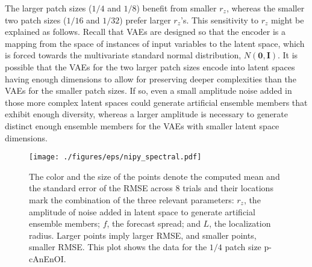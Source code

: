 \documentclass[final,3p]{elsarticle}
\theoremstyle{break}
\newcommand{\bb}[1]{\mathbf{#1}}
\begin{document}
The larger patch sizes ($1/4$ and $1/8$) benefit from smaller $r_z$, whereas the smaller two patch sizes ($1/16$ and $1/32$) prefer larger $r_z$'s.
This sensitivity to $r_z$ might be explained as follows.
Recall that VAEs are designed so that the encoder is a mapping from the space of instances of input variables to the latent space, which is forced towards the multivariate standard normal distribution, $N(\bb{0}, \bb{I})$. 
It is possible that the VAEs for the two larger patch sizes encode into latent spaces having enough dimensions to allow for preserving deeper complexities than the VAEs for the smaller patch sizes.
If so, even a small amplitude noise added in those more complex latent spaces could generate artificial ensemble members that exhibit enough diversity, whereas a larger amplitude is necessary to generate distinct enough ensemble members for the VAEs with smaller latent space dimensions.\par

\begin{figure}[h]
	\centering
	\texttt{[image: ./figures/eps/nipy\_spectral.pdf]}
	\caption{\label{fig:psweep} The color and the size of the points denote the computed mean and the standard error of the RMSE across 8 trials and their locations mark the combination of the three relevant parameters: $r_z$, the amplitude of noise added in latent space to generate artificial ensemble members; $f$, the forecast spread; and $L$, the localization radius. Larger points imply larger RMSE, and smaller points, smaller RMSE. This plot shows the data for the $1/4$ patch size p-cAnEnOI. 
	}
\end{figure}
\end{document}
